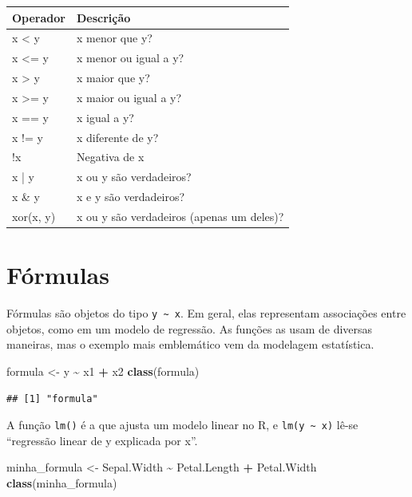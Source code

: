 \documentclass[
]{book}
\newenvironment{Shaded}{\begin{snugshade}}{\end{snugshade}}
\newcommand{\KeywordTok}[1]{\textcolor[rgb]{0.13,0.29,0.53}{\textbf{#1}}}
\newcommand{\NormalTok}[1]{#1}
\newcommand{\OperatorTok}[1]{\textcolor[rgb]{0.81,0.36,0.00}{\textbf{#1}}}
\newcommand{\StringTok}[1]{\textcolor[rgb]{0.31,0.60,0.02}{#1}}
\begin{document}
\begin{tabular}{l|l}
\hline
Operador & Descrição\\
\hline
x < y & x menor que y?\\
\hline
x <= y & x menor ou igual a y?\\
\hline
x > y & x maior que y?\\
\hline
x >= y & x maior ou igual a y?\\
\hline
x == y & x igual a y?\\
\hline
x != y & x diferente de y?\\
\hline
!x & Negativa de x\\
\hline
x | y & x ou y são verdadeiros?\\
\hline
x \& y & x e y são verdadeiros?\\
\hline
xor(x, y) & x ou y são verdadeiros (apenas um deles)?\\
\hline
\end{tabular}

\hypertarget{fuxf3rmulas}{%
\section{Fórmulas}\label{fuxf3rmulas}}

Fórmulas são objetos do tipo \texttt{y\ \textasciitilde{}\ x}. Em geral, elas representam associações entre objetos, como em um modelo de regressão. As funções as usam de diversas maneiras, mas o exemplo mais emblemático vem da modelagem estatística.

\begin{Shaded}
\begin{Highlighting}[]
\NormalTok{formula <{-}}\StringTok{ }\NormalTok{y }\OperatorTok{\textasciitilde{}}\StringTok{ }\NormalTok{x1 }\OperatorTok{+}\StringTok{ }\NormalTok{x2}
\KeywordTok{class}\NormalTok{(formula)}
\end{Highlighting}
\end{Shaded}

\begin{verbatim}
## [1] "formula"
\end{verbatim}

A função \texttt{lm()} é a que ajusta um modelo linear no R, e \texttt{lm(y\ \textasciitilde{}\ x)} lê-se ``regressão linear de y explicada por x''.

\begin{Shaded}
\begin{Highlighting}[]
\NormalTok{minha\_formula <{-}}\StringTok{ }\NormalTok{Sepal.Width }\OperatorTok{\textasciitilde{}}\StringTok{ }\NormalTok{Petal.Length }\OperatorTok{+}\StringTok{ }\NormalTok{Petal.Width}
\KeywordTok{class}\NormalTok{(minha\_formula)}
\end{Highlighting}
\end{Shaded}
\end{document}
